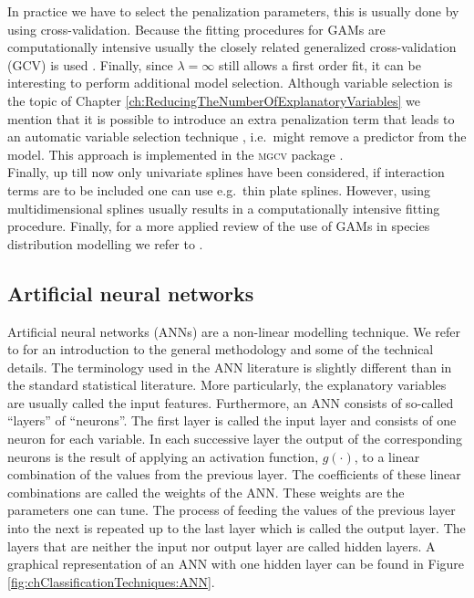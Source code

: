 In practice we have to select the penalization parameters, this is usually done by using cross-validation. Because the fitting procedures for GAMs are computationally intensive usually the closely related generalized cross-validation (GCV) is used \parencite{wood_gams_2002}. Finally, since $\lambda = \infty$ still allows a first order fit, it can be interesting to perform additional model selection. Although variable selection is the topic of Chapter \ref{ch:ReducingTheNumberOfExplanatoryVariables} we mention that it is possible to introduce an extra penalization term that leads to an automatic variable selection technique \parencite{marra_practical_2011}, i.e.\ might remove a predictor from the model. This approach is implemented in the \textsc{mgcv} package \parencite{mgcv}. \\

Finally, up till now only univariate splines have been considered, if interaction terms are to be included one can use e.g.\ thin plate splines. However, using multidimensional splines usually results in a computationally intensive fitting procedure. Finally, for a more applied review of the use of GAMs in species distribution modelling we refer to \cite{guisan_generalized_2002}.

\subsection{Artificial neural networks}
Artificial neural networks (ANNs) are a non-linear modelling technique. We refer to \cite{bishop_neural_1995} for an introduction to the general methodology and some of the technical details. The terminology used in the ANN literature is slightly different than in the standard statistical literature. More particularly, the explanatory variables are usually called the input features. Furthermore, an ANN consists of so-called ``layers'' of ``neurons''. The first layer is called the input layer and consists of one neuron for each variable. In each successive layer the output of the corresponding neurons is the result of applying an activation function, $g(\cdot)$, to a linear combination of the values from the previous layer. The coefficients of these linear combinations are called the weights of the ANN. These weights are the parameters one can tune. The process of feeding the values of the previous layer into the next is repeated up to the last layer which is called the output layer. The layers that are neither the input nor output layer are called hidden layers. A graphical representation of an ANN with one hidden layer can be found in Figure \ref{fig:chClassificationTechniques:ANN}.\\

